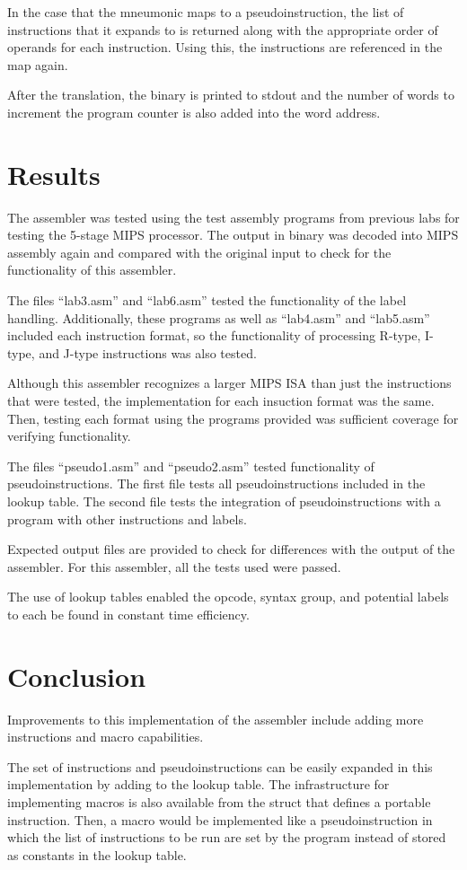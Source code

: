\documentclass[titlepage]{article}
\begin{document}
In the case that the mneumonic maps to a pseudoinstruction, the list of 
instructions that it expands to is returned along with the appropriate order of
operands for each instruction. Using this, the instructions are referenced in 
the map again.

After the translation, the binary is printed to stdout and the number of words 
to increment the program counter is also added into the word address. 

\section*{Results}

The assembler was tested using the test assembly programs from previous labs for
testing the 5-stage MIPS processor. The output in binary was decoded into MIPS 
assembly again and compared with the original input to check for the 
functionality of this assembler.

The files ``lab3.asm'' and ``lab6.asm'' tested the functionality of the label 
handling. Additionally, these programs as well as ``lab4.asm'' and ``lab5.asm'' 
included each instruction format, so the functionality of processing R-type, 
I-type, and J-type instructions was also tested. 

Although this assembler recognizes a larger MIPS ISA than just the instructions
that were tested, the implementation for each insuction format was the same. 
Then, testing each format using the programs provided was sufficient coverage 
for verifying functionality.

The files ``pseudo1.asm'' and ``pseudo2.asm'' tested functionality of 
pseudoinstructions. The first file tests all pseudoinstructions included in the
lookup table. The second file tests the integration of pseudoinstructions with
a program with other instructions and labels. 

Expected output files are provided to check for differences with the output of
the assembler. For this assembler, all the tests used were passed.

The use of lookup tables enabled the opcode, syntax group, and potential labels 
to each be found in constant time efficiency. 

\section*{Conclusion}
Improvements to this implementation of the assembler include adding more 
instructions and macro capabilities.

The set of instructions and pseudoinstructions can be easily expanded in this
implementation by adding to the lookup table. The infrastructure for 
implementing macros is also available from the struct that defines a portable
instruction. Then, a macro would be implemented like a pseudoinstruction in 
which the list of instructions to be run are set by the program instead of 
stored as constants in the lookup table.
\end{document}

